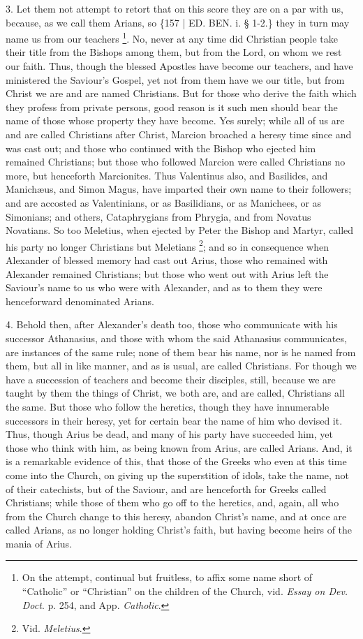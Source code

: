 3. Let them not attempt to
retort that on this score they are on a par with us, because, as we
call them Arians, so \{157 | ED.
BEN. i. § 1-2.\} they in turn may name us from
our teachers \footnote{On the attempt, continual but fruitless, to affix some name short of ``Catholic''
or ``Christian'' on the children of the Church, vid. \emph{Essay on Dev.
Doct}. p. 254, and App. \emph{Catholic}.}. No, never
at any time did Christian people take their title from the Bishops
among them, but from the Lord, on whom we rest our faith. Thus, though
the blessed Apostles have become our teachers, and have ministered the
Saviour's Gospel, yet not from them have we our title, but from Christ
we are and are named Christians. But for those who derive the faith
which they profess from private persons, good reason is it such men
should bear the name of those whose property they have become. Yes
surely; while all of us are and are called Christians after Christ,
Marcion broached a heresy time since and was cast out; and those who
continued with the Bishop who ejected him remained Christians; but
those who followed Marcion were called Christians no more, but
henceforth Marcionites. Thus Valentinus also, and Basilides, and
Manichæus, and Simon Magus, have imparted their own name to their
followers; and are accosted as Valentinians, or as Basilidians, or as
Manichees, or as Simonians; and others, Cataphrygians from Phrygia,
and from Novatus Novatians. So too Meletius, when ejected by Peter the
Bishop and Martyr, called his party no longer Christians but Meletians
\footnote{Vid. \emph{Meletius}.}; and so in consequence
when Alexander of blessed memory had cast out Arius, those who
remained with Alexander remained Christians; but those who went out
with Arius left the Saviour's name to us who were with Alexander, and
as to them they were henceforward denominated Arians.

4. Behold then, after
Alexander's death too, those who communicate with his successor
Athanasius, and those with whom the said Athanasius communicates, are
instances of the same rule; none of them bear his name, nor is
he named from them, but all in like manner, and as is usual, are
called Christians. For though we have a succession of teachers and
become their disciples, still, because we are taught by them the
things of Christ, we both are, and are called, Christians all the
same. But those who follow the heretics, though they have innumerable
successors in their heresy, yet for certain bear the name of him who
devised it. Thus, though Arius be dead, and many of his party have
succeeded him, yet those who think with him, as being known from Arius,
are called Arians. And, it is a remarkable evidence of this, that
those of the Greeks who even at this time come into the Church, on
giving up the superstition of idols, take the name, not of their
catechists, but of the Saviour, and are henceforth for Greeks called
Christians; while those of them who go off to the heretics, and,
again, all who from the Church change to this heresy, abandon Christ's
name, and at once are called Arians, as no longer holding Christ's
faith, but having become heirs of the mania of Arius.


